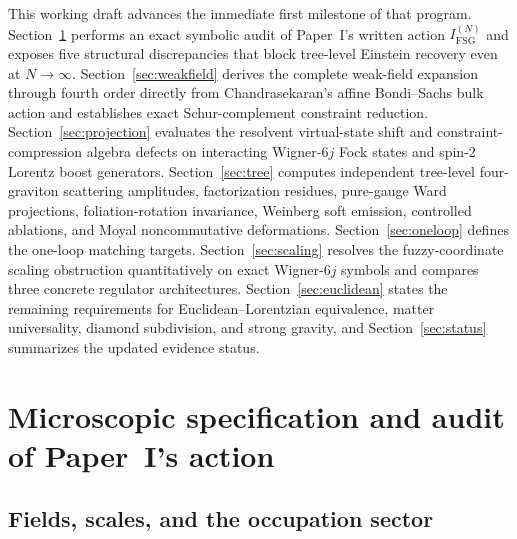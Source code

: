 \documentclass[11pt]{article}
\begin{document}
This working draft advances the immediate first milestone of that program. Section~\ref{sec:audit} performs an exact symbolic audit of Paper~I's written action $I_{\mathrm{FSG}}^{(N)}$ and exposes five structural discrepancies that block tree-level Einstein recovery even at $N\to\infty$. Section~\ref{sec:weakfield} derives the complete weak-field expansion through fourth order directly from Chandrasekaran's affine Bondi--Sachs bulk action and establishes exact Schur-complement constraint reduction. Section~\ref{sec:projection} evaluates the resolvent virtual-state shift and constraint-compression algebra defects on interacting Wigner-$6j$ Fock states and spin-2 Lorentz boost generators. Section~\ref{sec:tree} computes independent tree-level four-graviton scattering amplitudes, factorization residues, pure-gauge Ward projections, foliation-rotation invariance, Weinberg soft emission, controlled ablations, and Moyal noncommutative deformations. Section~\ref{sec:oneloop} defines the one-loop matching targets. Section~\ref{sec:scaling} resolves the fuzzy-coordinate scaling obstruction quantitatively on exact Wigner-$6j$ symbols and compares three concrete regulator architectures. Section~\ref{sec:euclidean} states the remaining requirements for Euclidean--Lorentzian equivalence, matter universality, diamond subdivision, and strong gravity, and Section~\ref{sec:status} summarizes the updated evidence status.

\section{Microscopic specification and audit of Paper~I's action}\label{sec:audit}

\subsection{Fields, scales, and the occupation sector}
\end{document}
